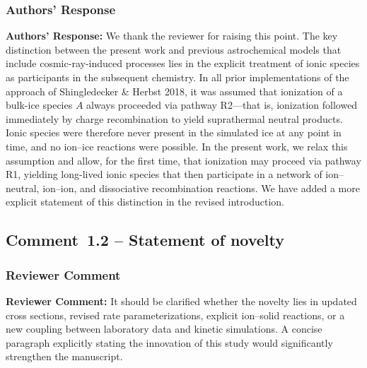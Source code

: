 \documentclass[12pt]{article}
\newcommand{\reviewlabel}{\textbf{\textcolor{commentframe}{Reviewer Comment:}}}
\newcommand{\responselabel}{\textbf{\textcolor{responseframe}{Authors' Response:}}}
\begin{document}
\subsubsection{Authors' Response}
\begin{responsebox}
\responselabel{} We thank the reviewer for raising this point. The key
distinction between the present work and previous astrochemical models that
include cosmic-ray-induced processes lies in the explicit treatment of ionic
species as participants in the subsequent chemistry. In all prior
implementations of the approach of Shingledecker \& Herbst 2018, it was
assumed that ionization of a bulk-ice species $A$ always proceeded via pathway
R2---that is, ionization followed immediately by charge recombination to yield
suprathermal neutral products. Ionic species were therefore never present in
the simulated ice at any point in time, and no ion--ice reactions were
possible. In the present work, we relax this assumption and allow, for the
first time, that ionization may proceed via pathway R1, yielding long-lived
ionic species that then participate in a network of ion--neutral, ion--ion, and
dissociative recombination reactions. We have added a more explicit statement
of this distinction in the revised introduction.
\end{responsebox}

\subsection{Comment~1.2 -- Statement of novelty}

\subsubsection{Reviewer Comment}
\begin{reviewerbox}
\reviewlabel{} It should be clarified whether the novelty lies in updated
cross sections, revised rate parameterizations, explicit ion--solid reactions,
or a new coupling between laboratory data and kinetic simulations. A concise
paragraph explicitly stating the innovation of this study would significantly
strengthen the manuscript.
\end{reviewerbox}
\end{document}
